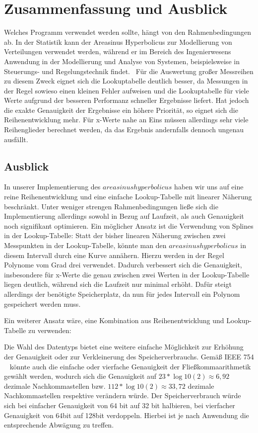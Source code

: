 \documentclass[course=erap] {aspdoc}
\begin{document}
    \section{Zusammenfassung und Ausblick}
    Welches Programm verwendet werden sollte, hängt von den Rahmenbedingungen ab.
    In der Statistik kann der Areasinus Hyperbolicus zur Modellierung von Verteilungen verwendet werden, während er im Bereich des Ingenierwesens
    Anwendung in der Modellierung und Analyse von Systemen, beispielsweise in Steuerungs- und Regelungstechnik findet.~\cite{TODO}
    Für die Auswertung großer Messreihen zu diesem Zweck eignet sich die Lookuptabelle deutlich besser, da Messungen in der Regel sowieso einen kleinen Fehler aufweisen und die Lookuptabelle für viele Werte aufgrund der besseren Performanz schneller Ergebnisse liefert.
    Hat jedoch die exakte Genauigkeit der Ergebnisse ein höhere Priorität, so eignet sich die Reihenentwicklung mehr.
    Für x-Werte nahe an Eins müssen allerdings sehr viele Reihenglieder berechnet werden, da das Ergebnis andernfalls dennoch ungenau ausfällt.

    \subsection{Ausblick}

    In unserer Implementierung des $areasinus hyperbolicus$ haben wir uns auf eine reine Reihenentwicklung und eine einfache Lookup-Tabelle mit linearer Näherung beschränkt.
    Unter weniger strengen Rahmenbedingungen ließe sich die Implementierung allerdings sowohl in Bezug auf Laufzeit, als auch Genauigkeit noch signifikant optimieren.
    Ein möglicher Ansatz ist die Verwendung von Splines in der Lookup-Tabelle: Statt der bisher linearen Näherung zwischen zwei Messpunkten in der Lookup-Tabelle, könnte man den $areasinus hyperbolicus$ in diesem Intervall durch eine Kurve annähern.
    Hierzu werden in der Regel Polynome vom Grad drei verwendet.
    Dadurch verbessert sich die Genauigkeit, insbesondere für x-Werte die genau zwischen zwei Werten in der Lookup-Tabelle liegen deutlich, während sich die Laufzeit nur minimal erhöht.
    Dafür steigt allerdings der benötigte Speicherplatz, da nun für jedes Intervall ein Polynom gespeichert werden muss.

    Ein weiterer Ansatz wäre, eine Kombination aus Reihenentwicklung und Lookup-Tabelle zu verwenden:

    Die Wahl des Datentyps bietet eine weitere einfache Möglichkeit zur Erhöhung der Genauigkeit oder zur Verkleinerung des Speicherverbrauchs.
    Gemäß IEEE 754 ~\cite{StandardforBinaryFloating} könnte auch die einfache oder vierfache Genauigkeit der
    Fließkommaarithmetik gewählt werden, wodurch sich die Genauigkeit auf $23*\log10(2) \approx 6,92$ dezimale Nachkommastellen
    bzw. $112*\log10(2) \approx 33,72$ dezimale Nachkommastellen respektive verändern würde.
    Der Speicherverbrauch würde sich bei einfacher Genauigkeit von 64 bit auf 32 bit halbieren, bei vierfacher Genauigkeit von 64bit auf 128bit verdoppeln.
    Hierbei ist je nach Anwendung die entsprechende Abwägung zu treffen.
\end{document}
